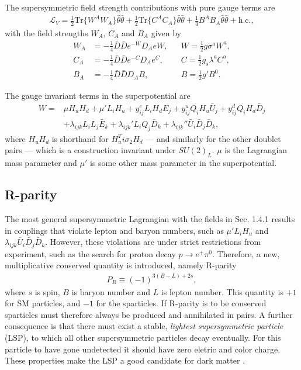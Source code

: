 \documentclass[twoside,english]{uiofysmaster}
\begin{document}
The supersymmetric field strength contributions with pure gauge terms are
\begin{align}
\mathcal{L}_V = \frac{1}{2} \text{Tr} \big \{ W^AW_A \big \} \bar{\theta} \bar{\theta} + \frac{1}{2} \text{Tr} \big \{ C^AC_A \big \} \bar{\theta} \bar{\theta} + \frac{1}{4} B^AB_A \bar{\theta} \bar{\theta} + \text{h.c.},
\end{align}
with the field strengths $W_A$, $C_A$ and $B_A$ given by
\begin{align}
W_A &= - \frac{1}{4} \bar{D} \bar{D} e^{-W}D_A eW, &&W = \frac{1}{2} g \sigma^a W^a,\\
C_A &= - \frac{1}{4} \bar{D} \bar{D} e^{-C} D_A e^C, &&C = \frac{1}{2} g_s\lambda^a C^a,\\
B_A &= - \frac{1}{4} \bar{D} \bar{D} D_A B, &&B = \frac{1}{2}g'B^0.
\end{align}

The gauge invariant terms in the superpotential are
\begin{align}
W =& \mu H_u H_d + \mu' L_i H_u + y_{ij}^e L_i H_d E_j + y_{ij}^u Q_i H_u \bar{U}_j + y_{ij}^d Q_i H_d \bar{D}_j \nonumber \\
&+ \lambda_{ijk} L_i L_j\bar{E}_k + \lambda_{ijk}' L_i Q_j \bar{D}_k + \lambda_{ijk}'' \bar{U}_i \bar{D}_j \bar{D}_k,
\end{align}
where $H_uH_d$ is shorthand for $H_u^T i \sigma_2 H_d$ --- and similarly for the other doublet pairs --- which is a construction invariant under $SU(2)_L$. $\mu$ is the Lagrangian mass parameter and $\mu'$ is some other mass parameter in the superpotential.
 

\subsection{R-parity}

The most general supersymmetric Lagrangian with the fields in Sec. 1.4.1 results in couplings that violate lepton and baryon numbers, such as $\mu' L_i H_u$ and $ \lambda_{ijk} \bar{U}_i \bar{D}_j \bar{D}_k $. However, these violations are under strict restrictions from experiment, such as the search for proton decay $p \rightarrow e^+ \pi^0$. Therefore, a new, multiplicative conserved quantity is introduced, namely R-parity
\begin{align}\label{Eq:: R-parity}
P_R \equiv (-1)^{3(B-L) +2s},
\end{align}
where $s$ is spin, $B$ is baryon number and $L$ is lepton number. This quantity is $+1$ for SM particles, and $-1$ for the sparticles. If R-parity is to be conserved sparticles must therefore always be produced and annihilated in pairs. A further consequence is that there must exist a stable, \textit{lightest supersymmetric particle} (LSP), to which all other supersymmetric particles decay eventually. For this particle to have gone undetected it should have zero eletric and color charge. These properties make the LSP a good candidate for dark matter \cite{weinberg_1995}.
\end{document}
